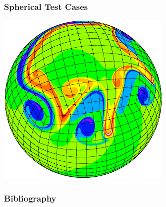 \documentclass[10pt]{beamer}
\begin{document}
      \begin{frame}
        \frametitle{Spherical Test Cases}
        \centering
        \includegraphics[scale=0.6]{Figures/cubed_sphere_vorticity.png}
      \end{frame}

    \begin{frame}[allowframebreaks]
      \frametitle{Bibliography}
      \nocite{*}
      \printbibliography{}
    \end{frame}
\end{document}
